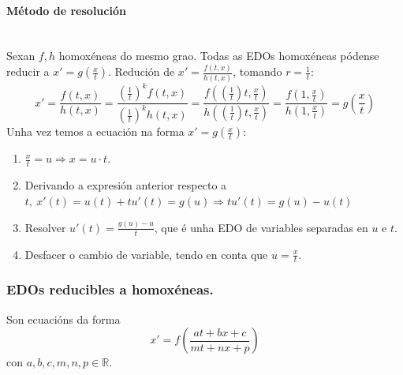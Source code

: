 \documentclass[11pt, a4paper,twoside]{article}
\theoremstyle{theorem-style}  %
\theoremstyle{definition-style}
\theoremstyle{example-style}
\begin{document}
\paragraph{Método de resolución} \ \\
Sexan $ f,h $ homoxéneas do mesmo grao. Todas as EDOs homoxéneas pódense reducir a $ x'=g(\frac{x}{t})$.
Redución de  $ x'=\frac{f(t,x)}{h(t,x)} $, tomando $ r=\frac{1}{t} $:
	\[ x'= \frac{f(t,x)}{h(t,x)}=\frac{(\frac{1}{t})^kf(t,x)}{(\frac{1}{t})^kh(t,x)}=\frac{f((\frac{1}{t})t,\frac{x}{t})}{h((\frac{1}{t})t,\frac{x}{t})}=\frac{f(1,\frac{x}{t})}{h(1,\frac{x}{t})}=g(\frac{x}{t})\]
	Unha vez temos a ecuación na forma $ x'=g(\frac{x}{t}) $:
	\begin{enumerate}
		\item $ \frac{x}{t}=u\Rightarrow x=u\cdot t $.
		\item Derivando a expresión anterior respecto a $t,\  x'(t)=u(t)+tu'(t)=g(u) \Rightarrow tu'(t)=g(u)-u(t) $
		\item Resolver $ u'(t)=\frac{g(u)-u}{t} $, que é unha EDO de variables separadas en $ u $ e $ t $.
		\item Desfacer o cambio de variable, tendo en conta que $ u=\frac{x}{t} $.
	\end{enumerate}

\subsubsection{EDOs reducibles a homoxéneas.}
Son ecuacións da forma \[ x'=f(\frac{at+bx+c}{mt+nx+p}) \]con $ a,b,c,m,n,p \in \mathbb{R} $.
\end{document}
